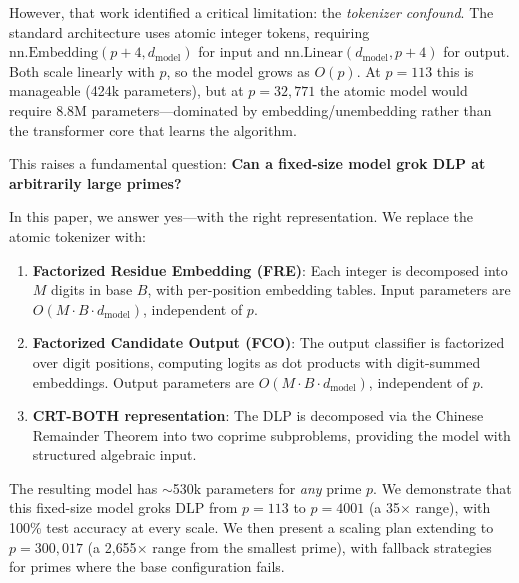 \documentclass[11pt]{article}
\begin{document}
However, that work identified a critical limitation: the \emph{tokenizer confound}. The standard architecture uses atomic integer tokens, requiring $\mathrm{nn.Embedding}(p+4, d_{\mathrm{model}})$ for input and $\mathrm{nn.Linear}(d_{\mathrm{model}}, p+4)$ for output. Both scale linearly with $p$, so the model grows as $O(p)$. At $p = 113$ this is manageable (424k parameters), but at $p = 32{,}771$ the atomic model would require 8.8M parameters---dominated by embedding/unembedding rather than the transformer core that learns the algorithm.

This raises a fundamental question: \textbf{Can a fixed-size model grok DLP at arbitrarily large primes?}

In this paper, we answer yes---with the right representation. We replace the atomic tokenizer with:
\begin{enumerate}[leftmargin=*]
    \item \textbf{Factorized Residue Embedding (FRE)}: Each integer is decomposed into $M$ digits in base $B$, with per-position embedding tables. Input parameters are $O(M \cdot B \cdot d_{\mathrm{model}})$, independent of $p$.
    \item \textbf{Factorized Candidate Output (FCO)}: The output classifier is factorized over digit positions, computing logits as dot products with digit-summed embeddings. Output parameters are $O(M \cdot B \cdot d_{\mathrm{model}})$, independent of $p$.
    \item \textbf{CRT-BOTH representation}: The DLP is decomposed via the Chinese Remainder Theorem into two coprime subproblems, providing the model with structured algebraic input.
\end{enumerate}

The resulting model has $\sim$530k parameters for \emph{any} prime $p$. We demonstrate that this fixed-size model groks DLP from $p = 113$ to $p = 4001$ (a 35$\times$ range), with 100\% test accuracy at every scale. We then present a scaling plan extending to $p = 300{,}017$ (a 2{,}655$\times$ range from the smallest prime), with fallback strategies for primes where the base configuration fails.
\end{document}
